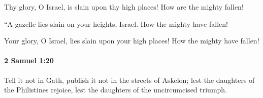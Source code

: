 			\begin{versebox}
					\item[BHS] 
					\item[ASV] Thy glory, O Israel, is slain upon thy high places! How are the mighty fallen!
					\item[NIV] “A gazelle lies slain on your heights, Israel. How the mighty have fallen!
					\item[NRSV] Your glory, O Israel, lies slain upon your high places! How the mighty have fallen!
			\end{versebox}

		\paragraph{2 Samuel 1:20} %
			\label{2SAMUEL-1-20}

			Tell it not in Gath, publish it not in the streets of Askelon; lest the daughters of the Philistines rejoice, lest the daughters of the uncircumcised triumph.

